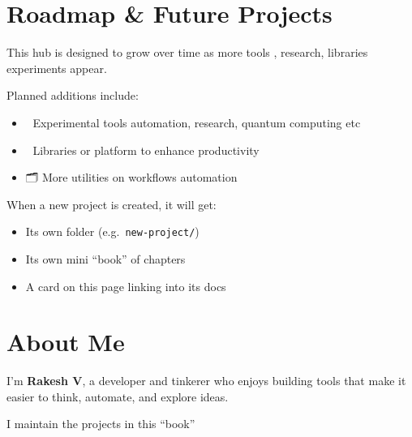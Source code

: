 \documentclass[
  letterpaper,
  DIV=11,
  numbers=noendperiod]{scrreprt}
\providecommand{\tightlist}{%
  \setlength{\itemsep}{0pt}\setlength{\parskip}{0pt}}
\begin{document}

\chapter{Roadmap \& Future Projects}\label{roadmap-future-projects}

This hub is designed to grow over time as more tools , research,
libraries experiments appear.

Planned additions include:

\begin{itemize}
\tightlist
\item
  🧪 Experimental tools automation, research, quantum computing etc\\
\item
  🧰 Libraries or platform to enhance productivity\\
\item
  🗂 More utilities on workflows automation
\end{itemize}

When a new project is created, it will get:

\begin{itemize}
\tightlist
\item
  Its own folder (e.g.~\texttt{new-project/})\\
\item
  Its own mini ``book'' of chapters\\
\item
  A card on this page linking into its docs
\end{itemize}


\chapter*{}\label{section}

\markboth{}{}


\chapter{About Me}\label{about-me}

I'm \textbf{Rakesh V}, a developer and tinkerer who enjoys building
tools that make it easier to think, automate, and explore ideas.

I maintain the projects in this ``book''
\end{document}
